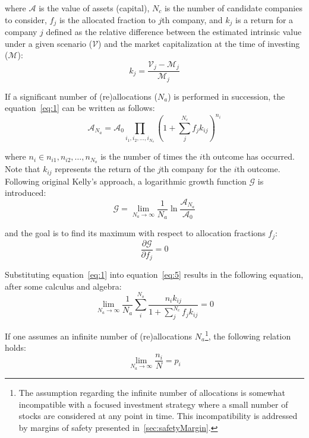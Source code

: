 \documentclass{article}
\begin{document}
\noindent where $\mathcal{A}$ is the value of assets (capital), $N_c$ is the
number of candidate companies to consider, $f_j$ is the allocated fraction to
$j$th company, and $k_j$ is a return for a company $j$ defined as the relative
difference between the estimated intrinsic value under a given scenario
($\mathcal{V}$) and the market capitalization at the time of investing
($\mathcal{M}$):
\begin{equation}
\label{eq:2}
    k_j = \frac{\mathcal{V}_j - \mathcal{M}_j}{\mathcal{M}_j}
\end{equation}

\noindent If a significant number of (re)allocations ($N_a$) is performed in
succession, the equation~\eqref{eq:1} can be written as follows:
\begin{equation}
\label{eq:3}
    \mathcal{A}_{N_a}
  = 
    \mathcal{A}_{0} \prod_{i_1, i_2, \hdots, i_{N_o}}
    \left( 1 + \sum_{j}^{N_c} f_j k_{ij} \right)^{n_i}
\end{equation} 

\noindent where $n_i \in {n_{i1}, n_{i2}, \hdots, n_{N_o}}$ is the number of
times the $i$th outcome has occurred. Note that $k_{ij}$ represents the return
of the $j$th company for the $i$th outcome. Following original Kelly's approach,
a logarithmic growth function $\mathcal{G}$ is introduced:
\begin{equation}
\label{eq:4}
    \mathcal{G} = \lim_{N_a \to \infty} \frac{1}{N_a} \ln
        \frac{\mathcal{A}_{N_a}}{\mathcal{A}_0}
\end{equation}

\noindent and the goal is to find its maximum with respect to allocation
fractions $f_j$:
\begin{equation}
\label{eq:5}
    \frac{\partial \mathcal{G}}{\partial f_j} = 0
\end{equation}

\noindent Substituting equation~\eqref{eq:1} into equation~\eqref{eq:5} results
in the following equation, after some calculus and algebra:
\begin{equation}
\label{eq:6}
    \lim_{N_a \to \infty} \frac{1}{N_a}
    \sum_{i}^{N_o} \frac{n_i k_{ij}}{1 + \sum_{j}^{N_c} f_j k_{ij}} = 0
\end{equation}

\noindent If one assumes an infinite number of (re)allocations
$N_a$\footnote{The assumption regarding the infinite number of allocations is
somewhat incompatible with a focused investment strategy where a small number of
stocks are considered at any point in time. This incompatibility is addressed by
margins of safety presented in~\autoref{sec:safetyMargin}.}, the following
relation holds:
\begin{equation}
\label{eq:7}
    \lim_{N_a \to \infty} \frac{n_i}{N} = p_i
\end{equation}
\end{document}
